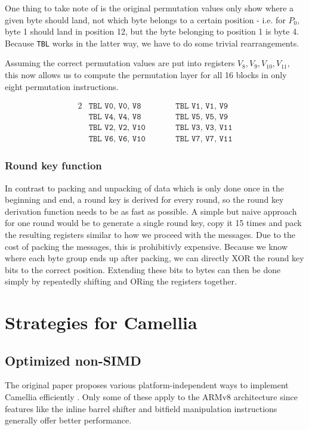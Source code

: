 One thing to take note of is the original permutation values only show where a
given byte should land, not which byte belongs to a certain position - i.e. for
$P_0$, byte 1 should land in position 12, but the byte belonging to position 1
is byte 4. Because \texttt{TBL} works in the latter way, we have to do some
trivial rearrangements.

Assuming the correct permutation values are put into registers
$V_8,V_9,V_{10},V_{11}$, this now allows us to compute the permutation layer
for all 16 blocks in only eight permutation instructions.

\begin{alignat*}{2}
    &\texttt{TBL V0, V0, V8}\qquad &&\texttt{TBL V1, V1, V9} \\
    &\texttt{TBL V4, V4, V8}\qquad &&\texttt{TBL V5, V5, V9} \\
    &\texttt{TBL V2, V2, V10}\qquad &&\texttt{TBL V3, V3, V11} \\
    &\texttt{TBL V6, V6, V10}\qquad &&\texttt{TBL V7, V7, V11}
\end{alignat*}

\subsubsection{Round key function}

In contrast to packing and unpacking of data which is only done once in the
beginning and end, a round key is derived for every round, so the round key
derivation function needs to be as fast as possible. A simple but naive
approach for one round would be to generate a single round key, copy it 15
times and pack the resulting registers similar to how we proceed with the
messages. Due to the cost of packing the messages, this is prohibitivly
expensive. Because we know where each byte group ends up after packing, we can
directly XOR the round key bits to the correct position. Extending these bits
to bytes can then be done simply by repeatedly shifting and ORing the registers
together.

\section{Strategies for Camellia}

\subsection{Optimized non-SIMD}

The original paper proposes various platform-independent ways to implement
Camellia efficiently \cite{camellia:2001}. Only some of these apply to the
ARMv8 architecture since features like the inline barrel shifter and bitfield
manipulation instructions generally offer better performance.

